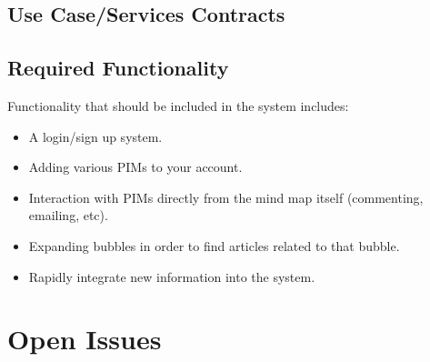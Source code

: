 \documentclass[hidelinks,english]{article}
\begin{document}
		\subsection{Use Case/Services Contracts}
	
	
		\subsection{Required Functionality}
			Functionality that should be included in the system includes:
			\begin{itemize}
			\item A login/sign up system. 
			\item Adding various PIMs to your account.
			\item Interaction with PIMs directly from the mind map itself (commenting, emailing, etc).
			\item Expanding bubbles in order to find articles related to that bubble.
			\item Rapidly integrate new information into the system.
			\end{itemize}
	
	\section{Open Issues}
	
\end{document}
